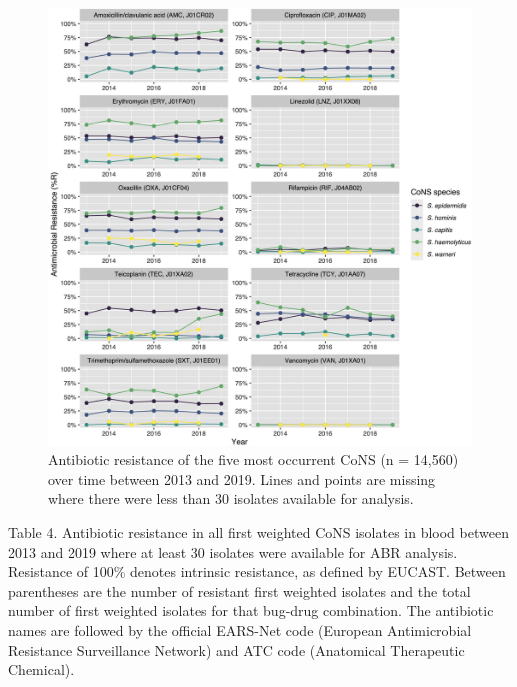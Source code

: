 \documentclass[
]{book}
\begin{document}
\begin{figure}

{\centering \includegraphics[width=1\linewidth]{images/07-03} 

}

\caption{Antibiotic resistance of the five most occurrent CoNS (n = 14,560) over time between 2013 and 2019. Lines and points are missing where there were less than 30 isolates available for analysis.}\label{fig:fig7-3}
\end{figure}

Table 4. Antibiotic resistance in all first weighted CoNS isolates in blood between 2013 and 2019 where at least 30 isolates were available for ABR analysis. Resistance of 100\% denotes intrinsic resistance, as defined by EUCAST. Between parentheses are the number of resistant first weighted isolates and the total number of first weighted isolates for that bug-drug combination. The antibiotic names are followed by the official EARS-Net code (European Antimicrobial Resistance Surveillance Network) and ATC code (Anatomical Therapeutic Chemical).
\end{document}
